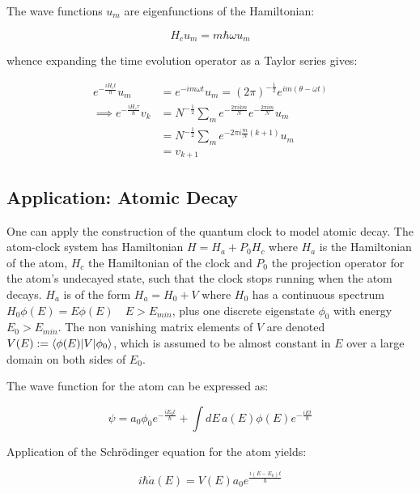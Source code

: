\documentclass{article}
\begin{document}
\noindent The wave functions $u_m$ are eigenfunctions of the Hamiltonian:

\begin{equation}
	H_cu_m = m\hbar\omega u_m
	\label{clockwavefunctions}
\end{equation}

\noindent whence expanding the time evolution operator as a Taylor series gives:

\begin{align}
	e^{-\frac{iH_ct}{\hbar}}u_m &= e^{-im\omega t}u_m = (2\pi)^{-\frac{1}{2}}e^{im(\theta-\omega t)} \\
	\implies e^{-\frac{iH_c\tau}{\hbar}}v_k &= N^{-\frac{1}{2}}\sum_{m}e^{-\frac{2\pi ikm}{N}}e^{-\frac{2\pi im}{N}}u_m \\
						       &= N^{-\frac{1}{2}}\sum_{m}e^{-2\pi i \frac{m}{N}(k+1)}u_m \\
						       &= v_{k+1}
\end{align}

\subsection{Application: Atomic Decay}
One can apply the construction of the quantum clock to model atomic decay. The atom-clock system has Hamiltonian $H=H_a+P_0H_c$ where $H_a$ is the Hamiltonian of the atom, $H_c$ the Hamiltonian of the clock and $P_0$ the projection operator for the atom's undecayed state, such that the clock stops running when the atom decays. $H_a$ is of the form $H_a=H_0+V$ where $H_0$ has a continuous spectrum $H_0\phi(E) = E\phi(E) \quad E>E_{min}$, plus one discrete eigenstate $\phi_0$ with energy $E_0>E_{min}$. The non vanishing matrix elements of $V$ are denoted $V(E) := \braket{\phi(E)|V|\phi_0}$, which is assumed to be almost constant in $E$ over a large domain on both sides of $E_0$.

\noindent The wave function for the atom can be expressed as:

\begin{equation}
	\psi = a_0\phi_0e^{-\frac{iE_0t}{\hbar}}+\int dE\, a(E)\phi(E)e^{-\frac{iEt}{\hbar}}
\end{equation}

\noindent Application of the Schr{\"o}dinger equation for the atom yields:

\begin{equation}
	i\hbar \dot{a}(E) = V(E)a_0e^{\frac{i(E-E_0)t}{\hbar}}
	\label{aODE}
\end{equation}
\end{document}
